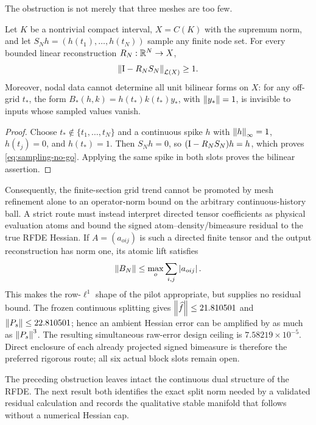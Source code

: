 The obstruction is not merely that three meshes are too few.

\begin{lemma}
\label{lem:finite-sampling-obstruction}
Let \(K\) be a nontrivial compact interval,
\(X=C(K)\) with the supremum norm, and let
\(S_Nh=(h(t_1),\ldots,h(t_N))\) sample any finite node set.  For every
bounded linear reconstruction \(R_N:\mathbb R^N\to X\),
\begin{equation}
 \left\lVert\mathrm I-R_NS_N\right\rVert_{\mathcal L(X)}\ge1.                \label{eq:sampling-no-go}
\end{equation}
Moreover, nodal data cannot determine all unit bilinear forms on \(X\): for
any off-grid \(t_*\), the form
\(B_*(h,k)=h(t_*)k(t_*)y_*\), with \(\left\lVert y_*\right\rVert=1\), is invisible to inputs
whose sampled values vanish.
\end{lemma}

\begin{proof}
Choose \(t_*\notin\{t_1,\ldots,t_N\}\) and a continuous spike \(h\) with
\(\left\lVert h\right\rVert_\infty=1\), \(h(t_j)=0\), and \(h(t_*)=1\).  Then \(S_Nh=0\), so
\((\mathrm I-R_NS_N)h=h\), which proves \cref{eq:sampling-no-go}.  Applying the
same spike in both slots proves the bilinear assertion.
\end{proof}

Consequently, the finite-section grid trend cannot be promoted by mesh refinement
alone to an operator-norm bound on the arbitrary continuous-history ball.
A strict route must instead interpret directed tensor coefficients as
physical evaluation atoms and bound the signed atom--density/bimeasure
residual to the true RFDE Hessian.  If \(A=(a_{oij})\) is such a directed
finite tensor and the output reconstruction has norm one, its atomic lift
satisfies
\begin{equation}
 \left\lVert B_N\right\rVert\le\max_o\sum_{i,j}\left\lvert a_{oij}\right\rvert.           \label{eq:atomic-bimeasure-lift}
\end{equation}
This makes the row-\(\ell^1\) shape of the pilot appropriate, but supplies no
residual bound.  The frozen continuous splitting gives
\(\left\lVert\widehat f\right\rVert\le21.810501\) and
\(\left\lVert P_s\right\rVert\le22.810501\); hence an ambient Hessian error can be amplified
by as much as \(\left\lVert P_s\right\rVert^3\).  The resulting simultaneous raw-error design
ceiling is \(7.58219\times10^{-5}\).  Direct enclosure of each already
projected signed bimeasure is therefore the preferred rigorous route; all six
actual block slots remain open.

The preceding obstruction leaves intact the continuous dual structure of the
RFDE.  The next result both identifies the exact split norm needed by a
validated residual calculation and records the qualitative stable manifold
that follows without a numerical Hessian cap.

